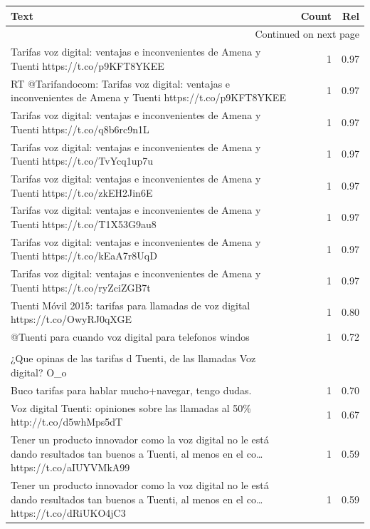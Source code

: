 \begin{longtable}{p{12.5cm}rr}
\toprule
Text & Count & Rel \\
\midrule
\endhead
\midrule
\multicolumn{3}{r}{{Continued on next page}} \\
\midrule
\endfoot

\bottomrule
\endlastfoot
Tarifas voz digital: ventajas e inconvenientes de Amena y Tuenti https://t.co/p9KFT8YKEE & 1 & 0.97 \\
RT @Tarifandocom: Tarifas voz digital: ventajas e inconvenientes de Amena y Tuenti https://t.co/p9KFT8YKEE & 1 & 0.97 \\
Tarifas voz digital: ventajas e inconvenientes de Amena y Tuenti https://t.co/q8b6rc9n1L & 1 & 0.97 \\
Tarifas voz digital: ventajas e inconvenientes de Amena y Tuenti https://t.co/TvYcq1up7u & 1 & 0.97 \\
Tarifas voz digital: ventajas e inconvenientes de Amena y Tuenti https://t.co/zkEH2Jin6E & 1 & 0.97 \\
Tarifas voz digital: ventajas e inconvenientes de Amena y Tuenti https://t.co/T1X53G9au8 & 1 & 0.97 \\
Tarifas voz digital: ventajas e inconvenientes de Amena y Tuenti https://t.co/kEaA7r8UqD & 1 & 0.97 \\
Tarifas voz digital: ventajas e inconvenientes de Amena y Tuenti https://t.co/ryZciZGB7t & 1 & 0.97 \\
Tuenti Móvil 2015: tarifas para llamadas de voz digital https://t.co/OwyRJ0qXGE & 1 & 0.80 \\
@Tuenti para cuando voz digital para telefonos windos & 1 & 0.72 \\
\begin{tabular}[c]{@{}l@{}}Hola @Converso72 \\ ¿Que opinas de las tarifas d Tuenti, de las llamadas Voz digital? O\_o \\ Buco tarifas para hablar mucho+navegar, tengo dudas.\end{tabular} & 1 & 0.70 \\
Voz digital Tuenti: opiniones sobre las llamadas al 50\% http://t.co/d5whMps5dT & 1 & 0.67 \\
Tener un producto innovador como la voz digital no le está dando resultados tan buenos a Tuenti, al menos en el co… https://t.co/aIUYVMkA99 & 1 & 0.59 \\
Tener un producto innovador como la voz digital no le está dando resultados tan buenos a Tuenti, al menos en el co… https://t.co/dRiUKO4jC3 & 1 & 0.59 \\

\end{longtable}

